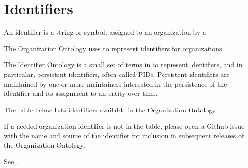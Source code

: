 \documentclass[letterpaper,10pt,english]{sphinxmanual}
\begin{document}
\chapter{Identifiers}
\label{\detokenize{identifiers:index-0}}\label{\detokenize{identifiers:id1}}\label{\detokenize{identifiers::doc}}
\sphinxAtStartPar
An identifier is a string or symbol, assigned to an organization by a {\hyperref[\detokenize{glossary:glossary}]{}}

\sphinxAtStartPar
The Organization Ontology uses  to represent identifiers for
organizations.

\sphinxAtStartPar
The Identifier Ontology is a small set of terms in  to represent identifiers,
and in particular, persistent identifiers, often called PIDs.  Persistent identifiers
are maintained by one or more maintainers interested in the persistence of the
identifier and its assignment to an entity over time.

\sphinxAtStartPar
The table below lists identifiers available in the Organization Ontology \sphinxstepexplicit %
\begin{footnote}[1]\label{\thesphinxscope.1}%
\sphinxAtStartFootnote
If a needed organization identifier is not in the table, please open a
Github issue with the name and source of the identifier for inclusion in subsequent
releases of the Organization Ontology.
%
\end{footnote}

\sphinxAtStartPar
See {\hyperref[\detokenize{identifiers:table-4}]{}}.
\end{document}
